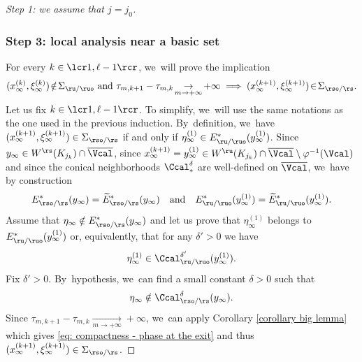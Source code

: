\begin{proof}[Step 1: we assume that $j = j_0$]
\subsubsection*{Step 3: local analysis near a basic set}
For every $k\in\lcr1,\ell-1\rcr$, we~will prove the implication
\begin{equation}\label{eq: compactness - proof implication}
(x_{\infty}^{(k)}, \xi_{\infty}^{(k)}) \!\notin\! \Sigma_{\ru/\ruo} \text{ and } \tau_{m,k +1} - \tau_{m,k} \!\underset{m\to+\infty}{\to}\! + \infty \implies (x_{\infty}^{(k+1)}, \xi_{\infty}^{(k+1)}) \!\in\! \Sigma_{\rso/\rs}.
\end{equation}
Let us fix $k\in\lcr1,\ell-1\rcr$. To simplify, we~will use the same notations as the one used in the previous induction. By~definition, we~have $(x_\infty^{(k+1)},\xi_\infty^{(k+1)}) \in \Sigma_{\rso/\rs}$ if and only if $\eta_{\infty}^{(1)} \in E_{\ru/\ruo}^* (y_{\infty}^{(1)})$. Since $y_{\infty} \in W^\rs (K_{j_k}) \cap \overline{\Vcal}$, since $x_{\infty}^{(k+1)} = y_{\infty}^{(1)} \in W^\ru (K_{j_k}) \cap \overline{\Vcal} \setminus \varphi^{-1} (\Vcal)$ and since the conical neighborhoods $\Ccal_{*}^{\delta}$ are well-defined on $\overline{\Vcal}$, we~have by construction
\[
E_{\rso/\rs}^* (y_{\infty}) = \widetilde{E}_{\rso/\rs}^* (y_{\infty}) \quad \text{and} \quad E_{\ru/\ruo}^* (y_{\infty}^{(1)}) = \widetilde{E}_{\ru/\ruo}^* (y_{\infty}^{(1)}).
\]
Assume that $\eta_{\infty} \notin E_{\rso/\rs}^* (y_{\infty})$ and let us prove that $\eta_{\infty}^{(1)}$ belongs to $E_{\ru/\ruo}^* (y_{\infty}^{(1)})$ or, equivalently, that for any $\delta' > 0$ we have
\begin{equation}\label{eq: compactness - phase at the exit}
\eta_{\infty}^{(1)} \in \Ccal_{\ru/\ruo}^{\delta'} (y_{\infty}^{(1)}).
\end{equation}
Fix $\delta' > 0$. By~hypothesis, we~can find a small constant $\delta > 0$ such that
\[
\eta_{\infty} \notin \Ccal_{\rso/\rs}^{\delta} (y_{\infty}).
\]
Since $\tau_{m,k +1} - \tau_{m,k} \underset{m\to+\infty}{\to} + \infty$, we~can apply Corollary \ref{corollary big lemma} which gives \eqref{eq: compactness - phase at the exit} and thus $(x_{\infty}^{(k+1)}, \xi_{\infty}^{(k+1)}) \in \Sigma_{\rso/\rs}$.


\end{proof}
